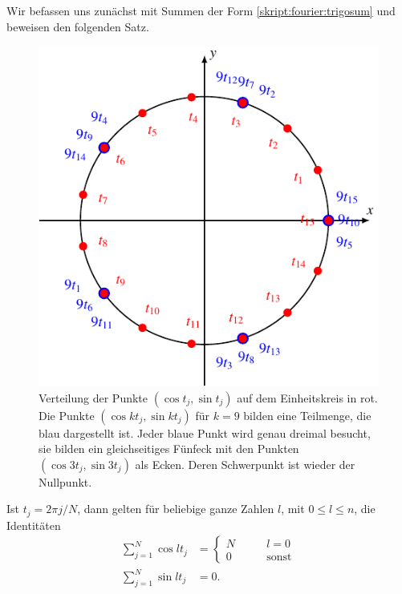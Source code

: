 Wir befassen uns zunächst mit Summen der Form
\eqref{skript:fourier:trigosum} und beweisen den folgenden Satz.

\begin{figure}
\centering
\includegraphics{chapters/6/trigosum.pdf}
\caption{Verteilung der Punkte $(\cos t_j, \sin t_j)$  auf dem Einheitskreis 
in rot.
Die Punkte $(\cos kt_j,\sin kt_j)$ für $k=9$ bilden eine Teilmenge, die
blau dargestellt ist.
Jeder blaue Punkt wird genau dreimal besucht, sie bilden ein gleichseitiges
Fünfeck mit den Punkten $(\cos 3t_j,\sin 3t_j)$ als Ecken.
Deren Schwerpunkt ist wieder der Nullpunkt.
\label{fourier:einheitskreis}
}
\end{figure}

\begin{satz}
\label{skript:fourier:orthogonalitaet1}
Ist $t_j=2\pi j/N$, dann gelten für beliebige ganze Zahlen $l$,
mit $0\le l\le n$, die Identitäten
\begin{equation*}
\begin{aligned}
\sum_{j=1}^N \cos lt_j
&=
\begin{cases}
N&\qquad l=0\\
0&\qquad\text{sonst}
\end{cases}
\\
\sum_{j=1}^N \sin lt_j
&=0.
\end{aligned}
\end{equation*}
\end{satz}

